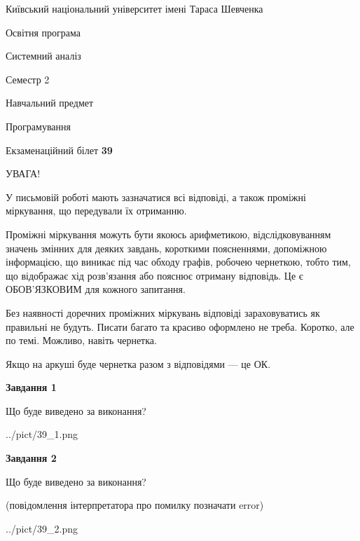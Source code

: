 \documentclass[12pt, ukrainian]{article}
\begin{document}
{{\begin {small}\par
{ \center  Київський національний університет імені Тараса Шевченка \par}
{\parbox {5 cm}{Освітня програма \hfill}{\parbox {7 cm}{Системний аналіз \hfill}}\parbox {6 cm}{\hfill Семестр 2}}\par
{\parbox {5 cm} {Навчальний предмет \hfill}\parbox {7 cm}{Програмування \hfill}\parbox {6cm}{\hfill}\par}\vspace{-7pt} \end{small}}{\center Екзаменаційний білет \No \textbf
{ 39 }\par}}
{
\begin {large}
УВАГА!

У письмовій роботі мають зазначатися всі відповіді, а також проміжні міркування, що передували їх отриманню.

Проміжні міркування можуть бути якоюсь арифметикою, відслідковуванням зна\-чень змінних для деяких завдань,
короткими поясненнями, допоміжною інформацією, що виникає під час обходу графів, робочею чернеткою,
тобто тим, що відображає хід розв’язання або пояснює отриману відповідь.
Це є ОБОВ’ЯЗКОВИМ для кожного запитання.

Без наявності доречних проміжних міркувань відповіді зараховуватись як правиль\-ні не будуть.
Писати багато та красиво оформлено не треба. Коротко, але по темі. Можли\-во, навіть чернетка.

Якщо на аркуші буде чернетка разом з відповідями --- це ОК.

\newpage

{\begin {center}\textbf{Завдання 1}\end {center}}\par
Що буде виведено за виконання?\par
\begin{center}
	{../pict/39_1.png}
\end{center}
\newpage

{\begin {center}\textbf{Завдання 2}\end {center}}\par
Що буде виведено за виконання?\par
 (повідомлення інтерпретатора про помилку позначати error)\par
\begin{center}
	{../pict/39_2.png}
\end{center}
\newpage


\end{large}}
\end{document}
